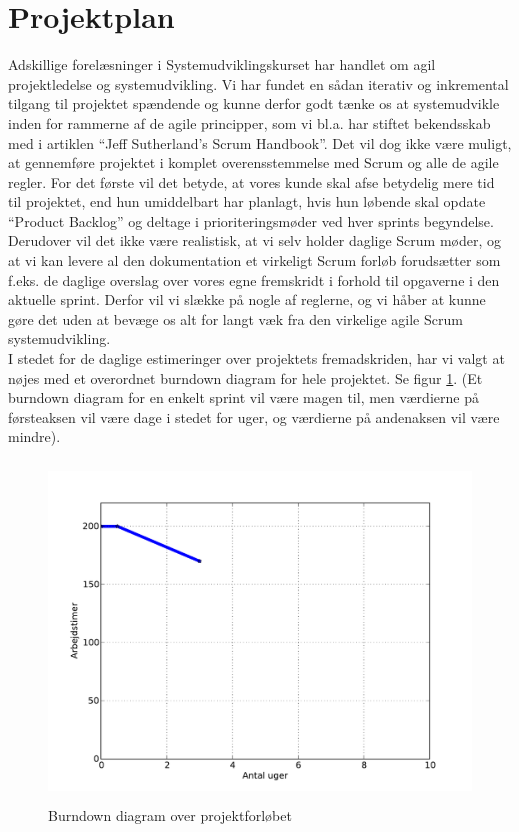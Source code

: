 \documentclass[12pt]{article}   %
\begin{document}
\section{Projektplan}
Adskillige forelæsninger i Systemudviklingskurset har handlet om agil projektledelse og systemudvikling. Vi har fundet en sådan iterativ og inkremental tilgang til projektet spændende og kunne derfor godt tænke os at systemudvikle inden for rammerne af de agile principper, som vi bl.a. har 
stiftet bekendsskab med i artiklen ``Jeff Sutherland's Scrum
Handbook''\cite{scrum}. Det vil dog ikke være muligt, at gennemføre projektet i komplet overensstemmelse med Scrum og alle de agile regler. For det første vil det betyde, at vores kunde skal afse betydelig mere tid til projektet, end hun umiddelbart har planlagt, hvis hun løbende skal opdate ``Product Backlog'' og deltage i prioriteringsmøder ved hver sprints begyndelse. Derudover vil det ikke være realistisk, at vi selv holder daglige Scrum møder,
og at vi kan levere al den dokumentation et virkeligt Scrum forløb
forudsætter som f.eks. de daglige overslag over vores egne fremskridt i forhold
til opgaverne i den aktuelle sprint. Derfor vil vi slække på nogle af 
reglerne, og vi håber at kunne gøre det uden at bevæge os alt for langt væk fra 
den virkelige agile Scrum systemudvikling.\\
I stedet for de daglige estimeringer over projektets fremadskriden, har vi
valgt at nøjes med et overordnet burndown diagram for hele projektet. Se figur
\ref{fig:bd}. (Et burndown diagram for en enkelt sprint vil være magen til,
men værdierne på førsteaksen vil være dage i stedet for uger, og værdierne på
andenaksen vil være mindre). 

\begin{figure}[!ht]
	\centering
\includegraphics[width=13cm, height=9cm]{burn2.pdf}
\caption{Burndown diagram over projektforløbet}
\label{fig:bd}
\end{figure}
\end{document}
